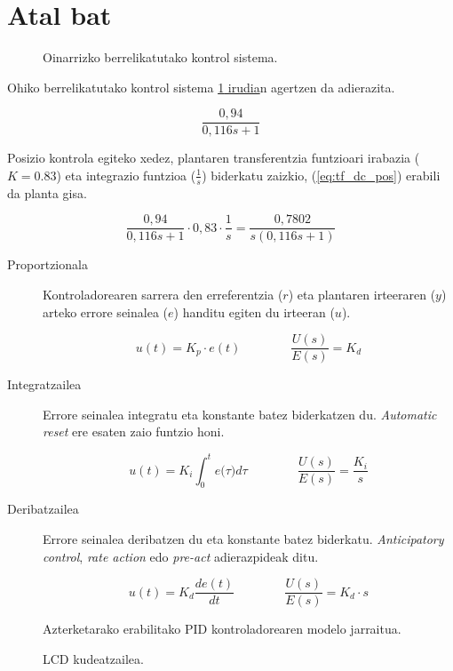 %

\section{Atal bat}

\begin{figure}[!htp]
\centering
%
\caption{Oinarrizko berrelikatutako kontrol sistema.}
\label{fig:mod_closedloop}
\end{figure}

Ohiko berrelikatutako kontrol sistema \hyperref[fig:mod_closedloop]{\ref*{fig:mod_closedloop} irudia}n agertzen da adierazita.

\begin{equation}
\dfrac{0,94}{0,116 s + 1}
\label{eq:tf_dc}
\end{equation}

Posizio kontrola egiteko xedez, plantaren transferentzia funtzioari irabazia ($K=0.83$) eta integrazio funtzioa ($\frac{1}{s}$) biderkatu zaizkio, (\ref{eq:tf_dc_pos}) erabili da planta gisa.

\begin{equation}
\dfrac{0,94}{0,116 s + 1} \cdot {0,83} \cdot \dfrac{1}{s} = \dfrac{0,7802}{s (0,116 s + 1)}
\label{eq:tf_dc_pos}
\end{equation}

\begin{description}
\item[Proportzionala]{\hfill

Kontroladorearen sarrera den erreferentzia ($r$) eta plantaren irteeraren ($y$) arteko errore seinalea ($e$) handitu egiten du irteeran ($u$).

\[
u(t)=K_p \cdot e(t) \qquad \qquad \frac{U(s)}{E(s)}=K_d
\]}
\item[Integratzailea]{\hfill

Errore seinalea integratu eta konstante batez biderkatzen du. \emph{Automatic reset} ere esaten zaio funtzio honi.

\[
u(t)=K_i \int^t_0{e(\tau}){d\tau} \qquad \qquad \frac{U(s)}{E(s)}=\frac{K_i}{s}
\]}
\item[Deribatzailea]{\hfill

Errore seinalea deribatzen du eta konstante batez biderkatu. \emph{Anticipatory control}, \emph{rate action} edo \emph{pre-act} adierazpideak ditu.

\[
u(t)=K_d \frac{de(t)}{dt} \qquad \qquad \frac{U(s)}{E(s)}=K_d \cdot s
\]}
\end{description}

\begin{figure}[!htp]
\centering
%
\caption[Modeloa: jarraitua (kontroladorea)]{Azterketarako erabilitako PID kontroladorearen modelo jarraitua.}
\label{fig:mod_cont_lum}
\end{figure}

\begin{figure}[!htp]
\centering
%
\caption{LCD kudeatzailea.}
\label{fig:lcd}
\end{figure}
